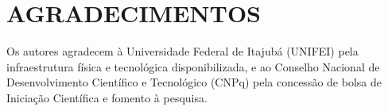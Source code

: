\section*{AGRADECIMENTOS}

Os autores agradecem à Universidade Federal de Itajubá (UNIFEI) pela infraestrutura física e tecnológica disponibilizada, e ao Conselho Nacional de Desenvolvimento Científico e Tecnológico (CNPq) pela concessão de bolsa de Iniciação Científica e fomento à pesquisa.
